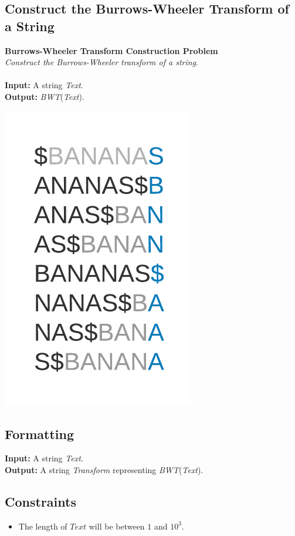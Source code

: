 \documentclass{article}
\begin{document}
\subsection{Construct the Burrows-Wheeler Transform of a String}
\hline\vspace{5}
\textbf{Burrows-Wheeler Transform Construction Problem}\\
\emph{Construct the Burrows-Wheeler transform of a string}.\\ \\
\textbf{Input:} A string \emph{Text}.\\
\textbf{Output:} \emph{BWT}(\emph{Text}).
\begin{center}
    \includegraphics[scale=0.2]{logos/9I.png} 
\end{center}
\hline\vspace{5}

\subsection*{Formatting}
\textbf{Input:} A string \emph{Text}.\\
\noindent\textbf{Output:} A string \emph{Transform} representing \emph{BWT}(\emph{Text}).

\subsection*{Constraints}
\begin{itemize}
    \item The length of $Text$ will be between $1$ and $10^3$.
\end{itemize}
\pagebreak
\end{document}
